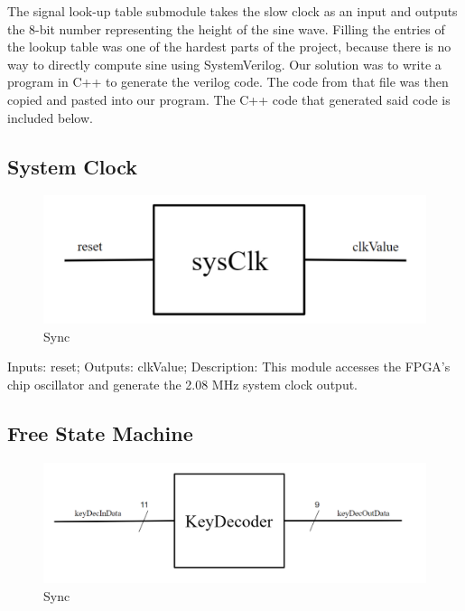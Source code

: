 \documentclass[a4paper]{article}
\begin{document}
The signal look-up table submodule takes the slow clock as an input and outputs the 8-bit number representing the height of the sine wave. Filling the entries of the lookup table was one of the hardest parts of the project, because there is no way to directly compute sine using SystemVerilog.
\newline\newline
Our solution was to write a program in C++ to generate the verilog code. The code from that file was then copied and pasted into our program. The C++ code that generated said code is included below.


\subsection{System Clock}

\begin{figure}[h]
    \includegraphics[width=6 in]{./Images/DiagramsYang/sysClk.png}
    \caption{Sync}
    \label{fig:16}
\end{figure}

Inputs: reset;
\newline\newline
Outputs: clkValue;
\newline\newline
Description: This module accesses the FPGA’s chip oscillator and generate the 2.08 MHz system clock output.


\subsection{Free State Machine}

\begin{figure}[h]
    \includegraphics[width=6 in]{./Images/DiagramsYang/keyDec.png}
    \caption{Sync}
    \label{fig:17}
\end{figure}
\end{document}
